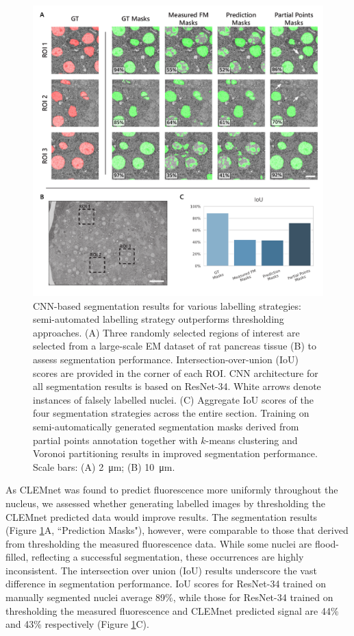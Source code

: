 \begin{figure}[!tb]
    \centering
    \includegraphics[width=\linewidth]{chapter-4/figures_PDF/fig4-6_segment.pdf}
    \caption{CNN-based segmentation results for various labelling strategies: semi-automated labelling strategy outperforms thresholding approaches.
    (A) Three randomly selected regions of interest are selected from a large-scale EM dataset of rat pancreas tissue (B) to assess segmentation performance. Intersection-over-union (IoU) scores are provided in the corner of each ROI. CNN architecture for all segmentation results is based on ResNet-34. White arrows denote instances of falsely labelled nuclei.
    (C) Aggregate IoU scores of the four segmentation strategies across the entire section. Training on semi-automatically generated segmentation masks derived from partial points annotation together with $k$-means clustering and Voronoi partitioning results in improved segmentation performance.
    Scale bars: (A) \SI{2}{\micro\meter}; (B) \SI{10}{\micro\meter}.}
    \label{fig:4.6_segmentation}
\end{figure}

As CLEMnet was found to predict fluorescence more uniformly throughout the nucleus, we assessed whether generating labelled images by thresholding the CLEMnet predicted data would improve results. The segmentation results (Figure \ref{fig:4.6_segmentation}A, ``Prediction Masks"), however, were comparable to those that derived from thresholding the measured fluorescence data. While some nuclei are flood-filled, reflecting a successful segmentation, these occurrences are highly inconsistent. The intersection over union (IoU) results underscore the vast difference in segmentation performance. IoU scores for ResNet-34 trained on manually segmented nuclei average 89\%, while those for ResNet-34 trained on thresholding the measured fluorescence and CLEMnet predicted signal are 44\% and 43\% respectively (Figure \ref{fig:4.6_segmentation}C).

